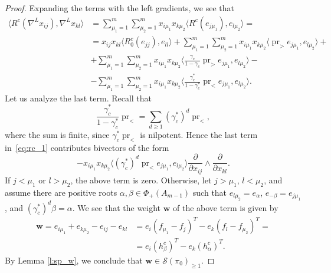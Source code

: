 \documentclass[11pt]{article}
\newcommand{\bw}{\mathbf{w}}
\DeclareMathOperator{\pr}{pr}
\theoremstyle{definition}\newtheorem{definition}[theorem]{Definition}
\theoremstyle{definition}\newtheorem{remark}[theorem]{Remark}
\theoremstyle{remark}
\numberwithin{equation}{section}
\begin{document}
\begin{proof}
    Expanding the terms with the left gradients, we see that
    \begin{equation}\label{eq:rc_1}
    \begin{split}
        \langle R^c(\nabla^L x_{ij}),\nabla^L x_{kl} \rangle &= \sum_{\mu_1=1}^m\sum_{\mu_2=1}^m x_{i\mu_1}x_{k\mu_2} \langle R^c(e_{j\mu_1}),e_{l\mu_2}\rangle = \\ &=x_{ij}x_{kl}\langle R_0^c(e_{jj}),e_{ll}\rangle + \sum_{\mu_1=1}^m\sum_{\mu_2=1}^mx_{i\mu_1}x_{k\mu_2}\langle \pr_{>}e_{j\mu_1},e_{l\mu_2}\rangle + \\ &+\sum_{\mu_1=1}^m \sum_{\mu_2=1}^m x_{i\mu_1}x_{k\mu_2}\langle \frac{\gamma_c}{1-\gamma_c}\pr_>e_{j\mu_1},e_{l\mu_2}\rangle - \\&-\sum_{\mu_1=1}^m \sum_{\mu_2=1}^m x_{i\mu_1}x_{k\mu_2}\langle \frac{\gamma_c^*}{1-\gamma_c^*}\pr_{<}e_{j\mu_1},e_{l\mu_2}\rangle.
        \end{split}
    \end{equation}
    Let us analyze the last term. Recall that
    \begin{equation*}
         \frac{\gamma_c^*}{1-\gamma_c^*}\pr_{<} = \sum_{d \geq 1} (\gamma_c^*)^d \pr_{<},
    \end{equation*}
    where the sum is finite, since $\gamma_c^*\pr_{<}$ is nilpotent. Hence the last term in~\eqref{eq:rc_1} contributes bivectors of the form
    \begin{equation}\label{eq:rc_4}
        -x_{i\mu_1}x_{k\mu_2}\langle (\gamma_c^*)^d\pr_{<}e_{j\mu_1},e_{l\mu_2}\rangle\frac{\partial}{\partial x_{ij}}\wedge \frac{\partial}{\partial x_{kl}}.
    \end{equation}
    If $j < \mu_1$ or $l > \mu_2$, the above term is zero. Otherwise, let $j > \mu_1$, $l < \mu_2$, and assume there are positive roots $\alpha,\beta \in \Phi_+(A_{m-1})$ such that $e_{l\mu_2} = e_{\alpha}$, $e_{-\beta} = e_{j\mu_1}$, and $(\gamma_c^*)^d \beta = \alpha$. We see that the weight $\bw$ of the above term is given by
    \begin{equation*}\begin{split}
        \bw = e_{i\mu_1} + e_{k\mu_2} - e_{ij} - e_{kl} &= e_i(f_{\mu_1}-f_{j})^T - e_k(f_{l}-f_{\mu_2})^T = \\ &=e_i(h_{\beta}^c)^T - e_k (h_{\alpha}^c)^T.
        \end{split}
    \end{equation*}
    By Lemma \ref{l:sp_w}, we conclude that $\bw  \in \mathcal{S}(\pi_0)_{\geq 1}$.


\end{proof}
\end{document}
